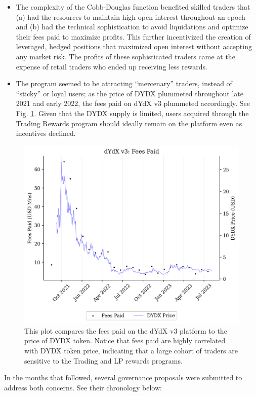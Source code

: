         \begin{itemize}
            \item The complexity of the Cobb-Douglas function benefited skilled traders that (a) had the resources to maintain high open interest throughout an epoch and (b) had the technical sophistication to avoid liquidations and optimize their fees paid to maximize profits. This further incentivized the creation of leveraged, hedged positions that maximized open interest without accepting any market risk. The profits of these sophisticated traders came at the expense of retail traders who ended up receiving less rewards.
            \item The program seemed to be attracting ``mercenary'' traders, instead of ``sticky'' or loyal users; as the price of DYDX plummeted throughout late 2021 and early 2022, the fees paid on dYdX v3 plummeted accordingly. See Fig. \ref{fig:fee_correlation}. Given that the DYDX supply is limited, users acquired through the Trading Rewards program should ideally remain on the platform even as incentives declined. 
        \end{itemize}

        \begin{figure}[htp]
            \centering
            \includegraphics[width=0.7\linewidth]{figs/fee_correlation.png}
            \caption{This plot compares the fees paid on the dYdX v3 platform to the price of DYDX token. Notice that fees paid are highly correlated with DYDX token price, indicating that a large cohort of traders are sensitive to the Trading and LP rewards programs.}
            \label{fig:fee_correlation}
        \end{figure}

        In the months that followed, several governance proposals were submitted to address both concerns. See their chronology below:

